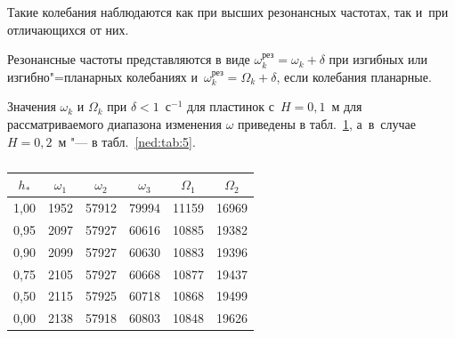 Такие колебания наблюдаются как при высших резонансных частотах, так и~при отличающихся от них.



Резонансные частоты представляются в виде $\omega_k^{\textrm{рез}}=\omega_k+\delta$ при изгибных или изгибно"=планарных колебаниях и~$\omega_k^{\textrm{рез}}=\Omega_k+\delta$, если колебания планарные. 

Значения $\omega_k$ и $\Omega_k$ при $\delta<1$~с$^{-1}$ для пластинок с~$H=0,1$~м для рассматриваемого диапазона изменения $\omega$ приведены в табл.~\ref{ned:tab:4}, а~в~случае $H=0,2$~м "--- в табл.~\ref{ned:tab:5}.




\begin{table}[h!] \centering \small

\caption{\label{ned:tab:4}}

\setlength{\extrarowheight}{4pt}

\setlength{\tabcolsep}{20pt}

\vspace{-3mm}

\begin{tabular}{c|c|c|c|c|c}

\hline

\footnotesize$h_{*}$ &\footnotesize $\omega_1$ &\footnotesize $\omega_2$ &\footnotesize $\omega_3$ &\footnotesize $\Omega_1$ &\footnotesize $\Omega_2$\\

\hline

\rule{0mm}{14pt}%

1,00 & 1952 & 57912 & 79994 & 11159 & 16969\\


0,95 & 2097 & 57927 & 60616 & 10885 & 19382\\


0,90 & 2099 & 57927 & 60630 & 10883 & 19396\\


0,75 & 2105 & 57927 & 60668 & 10877 & 19437\\


0,50 & 2115 & 57925 & 60718 & 10868 & 19499\\


0,00 & 2138 & 57918 & 60803 & 10848 & 19626\\

\hline

\end{tabular}

\end{table}



